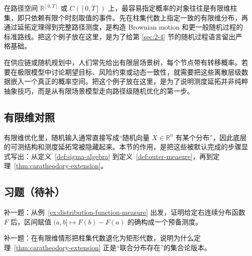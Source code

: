 \begin{example}\label{ex:cylinder-extension}
在路径空间 $\mathbb R^{[0,T]}$ 或 $C([0,T])$ 上，最容易指定概率的对象往往是有限维柱集，即只依赖有限个时刻取值的事件。先在柱集代数上指定一致的有限维分布，再通过延拓定理得到完整路径测度，是构造 Brownian motion 和更一般随机过程的标准路线。把这个例子放在这里，是为了给第 \ref{sec:2-4} 节的随机过程语言留出严格基础。
\end{example}

\begin{example}\label{ex:scenario-tree-measure}
在供应链或随机规划中，人们常先给出有限层场景树，每个节点带有转移概率。若要在极限模型中讨论期望目标、风险约束或动态一致性，就需要把这些离散层级数据嵌入一个真正的概率空间。把这个例子放在这里，是为了说明测度延拓并非纯粹抽象技巧，而是从有限场景模型走向路径级随机优化的第一步。
\end{example}

\subsection*{有限维对照}

有限维优化里，随机输入通常直接写成“随机向量 $X\in \mathbb R^n$ 有某个分布”，因此底层的可测结构和测度延拓常被隐藏起来。本节的作用，是把这些被默认完成的步骤显式写出：从定义~\ref{def:sigma-algebra} 到定义~\ref{def:outer-measure}，再到定理~\ref{thm:caratheodory-extension}。

\subsection*{习题（待补）}

\begin{exercise}[分布函数延拓占位]\label{exr:distribution-extension-placeholder}
补一题：从例~\ref{ex:distribution-function-measure} 出发，证明给定右连续分布函数 $F$ 后，区间赋值 $(a,b]\mapsto F(b)-F(a)$ 的确构成一个预备测度。
\end{exercise}

\begin{exercise}[柱集桥接题占位]\label{exr:cylinder-extension-placeholder}
补一题：在有限维情形把柱集代数退化为矩形代数，说明为什么定理~\ref{thm:caratheodory-extension} 正是“联合分布存在”的集合论版本。
\end{exercise}

